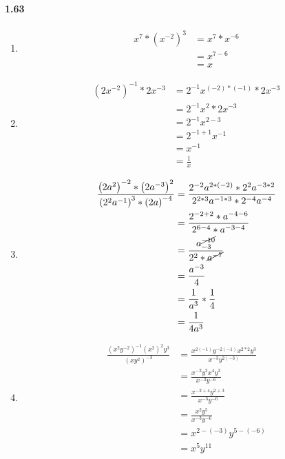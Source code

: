 \documentclass{article}
\newcommand\litem[1]{\item{\bfseries#1\space}}
\begin{document}
\paragraph{1.63}
\begin{enumerate}[label=\emph{\alph*})]
\litem{
\begin{align*}
  x^7 * \left(x^{-2}\right)^3 &= x^7 * x^{-6} \\
  &= x^{7 - 6} \\
  &= x
\end{align*}
}
\litem{
\begin{align*}
  \left(2x^{-2}\right)^{-1} * 2x^{-3} &= 2^{-1}x^{(-2) * (-1)} * 2x^{-3} \\
  &= 2^{-1}x^2 * 2x^{-3} \\
  &= 2^{-1}x^{2 - 3} \\
  &= 2^{-1 + 1}x^{-1} \\
  &= x^{-1} \\
  &= \frac{1}{x}
\end{align*}
}
\litem{
\begin{align*}
  \frac{\left(2a^2\right)^{-2} * \left(2a^{-3}\right)^2}{\left(2^2a^{-1}\right)^3 * \left(2a\right)^{-4}} &= \frac{2^{-2}a^{2 * (-2)} * 2^2a^{-3 * 2}}{2^{2 * 3}a^{-1 * 3} * 2^{-4}a^{-4}} \\
  &= \frac{2^{-2 + 2} * a^{-4 - 6}}{2^{6 - 4} * a^{-3 - 4}} \\
  &= \frac{a^{\cancel{-10}}_{-3}}{2^2 * \cancel{a^{-7}}} \\
  &= \frac{a^{-3}}{4} \\
  &= \frac{1}{a^3} * \frac{1}{4} \\
  &= \frac{1}{4a^3}
\end{align*}
}
\litem{
\begin{align*}
  \frac{\left(x^2y^{-2}\right)^{-1} \left(x^2\right)^2 y^3}{\left(xy^2\right)^{-3}} &= \frac{x^{2 (-1)} y^{-2 (-1)} x^{2 * 2} y^3}{x^{-3} y^{2 (-3)}} \\
  &= \frac{x^{-2}y^{2} x^4 y^3}{x^{-3}y^{-6}} \\
  &= \frac{x^{-2 + 4} y^{2 + 3}}{x^{-3}y^{-6}} \\
  &= \frac{x^2 y^5}{x^{-3}y^{-6}} \\
  &= x^{2 - (-3)}y^{5 - (-6)} \\
  &= x^5 y^{11}
\end{align*}
}
\end{enumerate}
\end{document}

